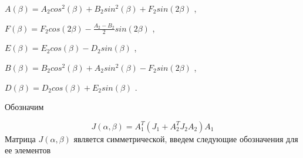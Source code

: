 \( A \left(  \beta  \right) =A_{2}cos^{2} \left(  \beta  \right) +B_{2}sin^{2} \left(  \beta  \right) +F_{2}sin \left( 2 \beta  \right)  \) ,\par

\( F \left(  \beta  \right) =F_{2}cos \left( 2 \beta  \right) -\frac{A_{2}-B_{2}}{2}sin \left( 2 \beta  \right)  \) ,\par

\( E \left(  \beta  \right) =E_{2}cos \left(  \beta  \right) -D_{2}sin \left(  \beta  \right)  \) ,\par

\( B \left(  \beta  \right) =B_{2}cos^{2} \left(  \beta  \right) +A_{2}sin^{2} \left(  \beta  \right) -F_{2}sin \left( 2 \beta  \right)  \) ,\par

\( D \left(  \beta  \right) =D_{2}cos \left(  \beta  \right) +E_{2}sin \left(  \beta  \right)  \) .\par

Обозначим\par

\begin{equation} %
\label{eq:p3:23}
J \left(  \alpha , \beta  \right) =A_{1}^{T} \left( J_{1}+A_{2}^{T}J_{2}A_{2} \right) A_{1}
\end{equation}
Матрица  \( J \left(  \alpha , \beta  \right)  \)  является симметрической, введем следующие обозначения для ее элементов\par


